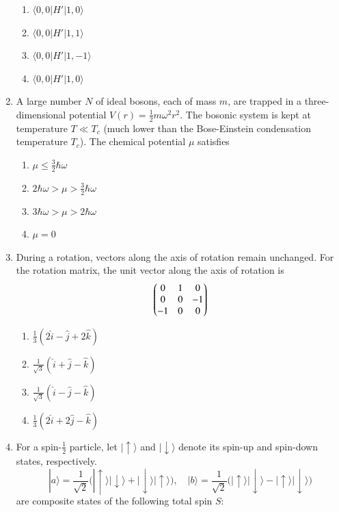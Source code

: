 \documentclass[journal,12pt,onecolumn]{IEEEtran}
\begin{document}
\begin{enumerate}[itemsep=0.45cm]
\hfill{}


\begin{enumerate}
\item $\langle 0,0| H' |1,0\rangle$
\item $\langle 0,0| H' |1,1\rangle$
\item $\langle 0,0| H' |1,-1\rangle$
\item $\langle 0,0| H' |1,0\rangle$
\end{enumerate}


\item A large number $N$ of ideal bosons, each of mass $m$, are trapped in a three-dimensional potential $V(r) = \frac{1}{2} m \omega^2 r^2$. The bosonic system is kept at temperature $T \ll T_c$ (much lower than the Bose-Einstein condensation temperature $T_c$). The chemical potential $\mu$ satisfies

\hfill{}


\begin{enumerate}
\item $\mu \le \frac{3}{2} \hbar \omega$
\item $2\hbar\omega > \mu > \frac{3}{2} \hbar \omega$
\item $3\hbar\omega > \mu > 2 \hbar \omega$
\item $\mu = 0$
\end{enumerate}


\item During a rotation, vectors along the axis of rotation remain unchanged. For the rotation matrix, the unit vector along the axis of rotation is
\[
\begin{pmatrix}0 & 1 & 0 \\ 0 & 0 & -1 \\ -1 & 0 & 0\end{pmatrix}
\]

\hfill{}

\begin{multicols}{4}
\begin{enumerate}
\item $\frac{1}{3} (2 \hat{i} - \hat{j} + 2 \hat{k})$
\item $\frac{1}{\sqrt{3}} (\hat{i} + \hat{j} - \hat{k})$
\item $\frac{1}{\sqrt{3}} (\hat{i} - \hat{j} - \hat{k})$
\item $\frac{1}{3} (2 \hat{i} + 2 \hat{j} - \hat{k})$
\end{enumerate}
\end{multicols}


\item For a spin-$\frac{1}{2}$ particle, let $|\uparrow\rangle$ and $|\downarrow\rangle$ denote its spin-up and spin-down states, respectively.  
\[
|a\rangle = \frac{1}{\sqrt{2}} \big(|\uparrow\rangle|\downarrow\rangle + |\downarrow\rangle|\uparrow\rangle \big), \quad
|b\rangle = \frac{1}{\sqrt{2}} \big(|\uparrow\rangle|\downarrow\rangle - |\uparrow\rangle|\downarrow\rangle \big)
\]  
are composite states of the following total spin $S$:


\end{enumerate}
\end{document}
